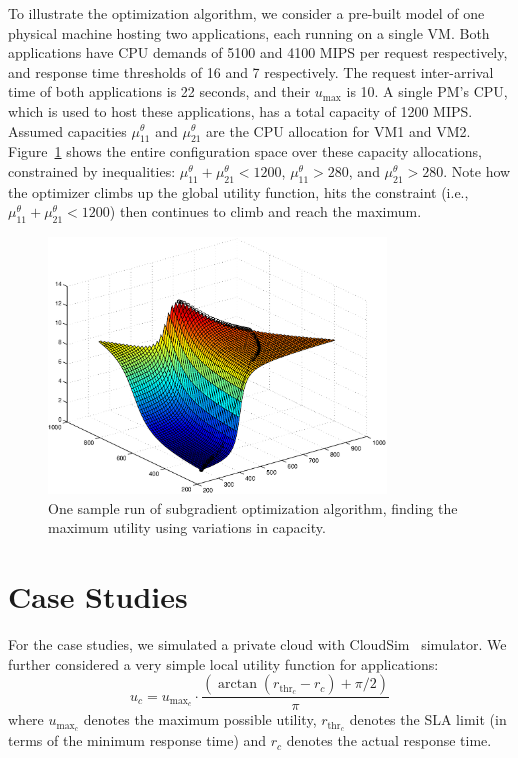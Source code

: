 To illustrate the optimization algorithm, we consider a pre-built model of one physical machine hosting two applications, each running on a single VM. Both applications have CPU demands of 5100 and 4100 MIPS per request respectively, and response time thresholds of 16 and 7 respectively. The request inter-arrival time of both applications is 22 seconds, and their $u_{\text{max}}$ is 10.  A single PM's CPU, which is used to host these applications, has a total capacity of 1200 MIPS.
 Assumed capacities $\mu^\theta_{11}$ and $\mu^\theta_{21}$ are the CPU allocation for VM1 and VM2. Figure~\ref{fig:sample-config-space-for-subgradient-optimization} shows the entire configuration space over these capacity allocations, constrained by inequalities:
 $\mu^\theta_{11}+\mu^\theta_{21}<1200$, $\mu^\theta_{11}>280$, and $\mu^\theta_{21}>280$.
Note how the optimizer climbs up the global utility function, hits the
constraint (i.e., $\mu^\theta_{11}+\mu^\theta_{21}<1200$) then continues to climb and reach the maximum.

\begin{figure}[h]
	\centering
		\includegraphics[width=0.8\textwidth]{image/centralized1/twoVM_1PM_optimality}
		\caption{One sample run of subgradient optimization algorithm, finding the
		maximum utility using variations in capacity.}   
	\label{fig:sample-config-space-for-subgradient-optimization}
\end{figure} 


\section{Case Studies}
\label{sec:case-studies}
For the case studies, we simulated a private cloud with CloudSim~\cite{CLOUDSIM2010} simulator. 
We further considered a very simple local utility function for applications:
\begin{equation} \label{eq:local-utility-formula}
u_c = u_{{\text{max}}_c}\cdot\frac{\left(\arctan(r_{\text{thr}_c}-r_c)+ \pi/2\right)}{\pi} 
\end{equation}
where $u_{{\text{max}}_c}$ denotes the maximum possible utility, $r_{\text{thr}_c}$ denotes the SLA limit (in terms of the minimum response time) and
$r_c$ denotes the actual response time.

